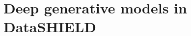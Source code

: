 \documentclass[12pt]{article}
\newcommand{\apkg}[1]{\emph{#1}}
\begin{document}
%
%



\clearpage
\FloatBarrier
\section{Deep generative models in DataSHIELD}\label{deepgends}
\end{document}

